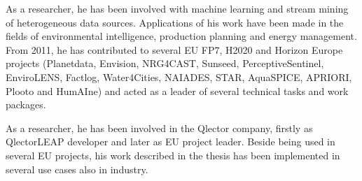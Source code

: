 As a researcher, he has been involved with machine learning and stream mining of heterogeneous data sources. 
Applications of his work have been made in the fields of environmental intelligence, production planning and energy management. 
From 2011, he has contributed to several EU FP7, H2020 and Horizon Europe projects (Planetdata, Envision, NRG4CAST, Sunseed, PerceptiveSentinel, EnviroLENS, Factlog, Water4Cities, NAIADES, STAR, AquaSPICE, APRIORI, Plooto and HumAIne) and acted as a leader of several technical tasks and work packages. 

As a researcher, he has been involved in the Qlector company, firstly as QlectorLEAP developer and later as EU project leader.
Beside being used in several EU projects, his work described in the thesis has been implemented in several use cases also in industry. 

